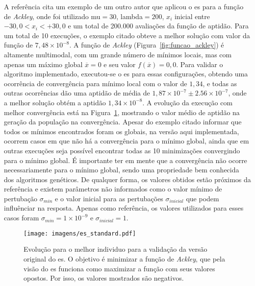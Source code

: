 A referência \cite[pp. 84]{eiben2003introduction} cita um exemplo de um
outro autor que aplicou o \acs{es} para a função de \emph{Ackley},
onde foi utilizado \acs{mu}$ = 30$, \acs{lambda}$ = 200$, $x_i$
inicial entre $-30,0 < x_i < +30,0$ e um total de 200.000 avaliações
da função de aptidão. Para um total de 10 execuções, o exemplo citado obteve a
melhor solução com valor da função de $7,48\times10^{-8}$. A função de
\emph{Ackley} (Figura~\ref{fig:funcao_ackley}) é altamente multimodal,
com um grande número de mínimos locais, mas com apenas um máximo
global $\overline{x}=0$ e seu valor $f(\overline{x})=0,0$. Para
validar o algoritmo implementado, executou-se o \acs{es} para essas
configurações, obtendo uma ocorrência de convergência para mínimo
local com o valor de $1,34$, e todas as outras ocorrências dão uma
aptidão de média de $1,87\times10^{-7}\pm2.56\times10^{-7}$, onde a
melhor solução obtém a aptidão $1,34\times10^{-8}$. A evolução da
execução com melhor convergência está na Figura~\ref{fig:es_standard},
mostrando o valor médio de aptidão na geração da população na
convergência. Apesar do exemplo citado informar que todos os mínimos
encontrados foram os globais, na versão aqui implementada, ocorrem
casos em que não há a convergência para o mínimo global, ainda que em
outras execuções seja possível encontrar todas as 10 minimizações
convergindo para o mínimo global. É importante ter em mente que a
convergência não ocorre necessariamente para o mínimo global, sendo
uma propriedade bem conhecida dos algoritmos genéticos.  De qualquer
forma, os valores obtidos estão próximos da referência e existem
parâmetros não informados como o valor mínimo de pertubação
$\sigma_{min}$ e o valor inicial para as pertubações
$\sigma_{inicial}$ que podem influênciar na resposta.  Apenas como
referência, os valores utilizados para esses casos foram
$\sigma_{min}=1\times10^{-9}$ e $\sigma_{inicial}=1$.



\begin{figure}[h!t]
\centering
\texttt{[image: imagens/es\_standard.pdf]}
\caption[Evolução para o melhor individuo para a validação da versão
original do ES]{Evolução para o melhor individuo para a validação da versão
original do \acs{es}. O objetivo é minimizar a função de
\emph{Ackley}, que pela visão do \acs{es} funciona como maximizar a
função com seus valores opostos. Por isso, os valores mostrados são
negativos.}
\label{fig:es_standard}
\end{figure}

